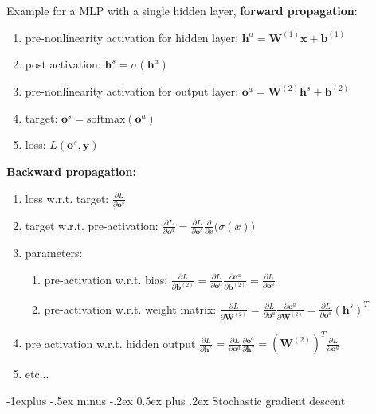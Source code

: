 \documentclass[10pt,landscape]{article}
\makeatletter
\renewcommand{\subsection}{\@startsection{subsection}{2}{0mm}%
                                {-1explus -.5ex minus -.2ex}%
                                {0.5ex plus .2ex}%
                                {\normalfont\normalsize\bfseries}}
\makeatother
\begin{document}
\begin{multicols}{3}
Example for a MLP with a single hidden layer, \textbf{forward propagation}:

\begin{enumerate}
\item pre-nonlinearity activation for hidden layer: $\boldsymbol h^a = \boldsymbol W^{(1)} \boldsymbol x + \boldsymbol b^{(1)}$
\item post activation: $\boldsymbol h^s = \sigma(\boldsymbol h^a)$
\item pre-nonlinearity activation for output layer: $\boldsymbol o^a = \boldsymbol W^{(2)} \boldsymbol h^s + \boldsymbol b^{(2)}$
\item target: $\boldsymbol o^s = \text{softmax}(\boldsymbol o^a)$
\item loss: $L(\boldsymbol o^s, \boldsymbol y)$
\end{enumerate}

\textbf{Backward propagation:}

\begin{enumerate}
\item loss w.r.t. target: $\frac{\partial L}{\partial \boldsymbol o^s}$
\item target w.r.t. pre-activation: $\frac{\partial L}{\partial \boldsymbol o^a} = \frac{\partial L}{\partial \boldsymbol o^s} \frac{\partial}{\partial x} \big(\sigma(x)\big) $
\item parameters:
\begin{enumerate}
\item pre-activation w.r.t. bias: $\frac{\partial L}{\partial \boldsymbol b^{(2)}} = \frac{\partial L}{\partial \boldsymbol o^a} \frac{\partial \boldsymbol o^a}{\partial \boldsymbol b^{(2)}} = \frac{\partial L}{\partial \boldsymbol o^a}$
\item pre-activation w.r.t. weight matrix: $\frac{\partial L}{\partial \boldsymbol W^{(2)}} = \frac{\partial L}{\partial \boldsymbol o^a} \frac{\partial \boldsymbol o^a}{\partial \boldsymbol W^{(2)}} = \frac{\partial L}{\partial \boldsymbol o^a} (\boldsymbol h^s)^T$
\end{enumerate}
\item pre activation w.r.t. hidden output $\frac{\partial L}{\partial \boldsymbol h^s} = \frac{\partial L}{\partial \boldsymbol o^a}\frac{\partial \boldsymbol o^a}{\partial \boldsymbol h^s} = (\boldsymbol W^{(2)})^T \frac{\partial L}{\partial \boldsymbol o^a}$
\item etc...
\end{enumerate}

\subsection{Stochastic gradient descent}


\end{multicols}
\end{document}
